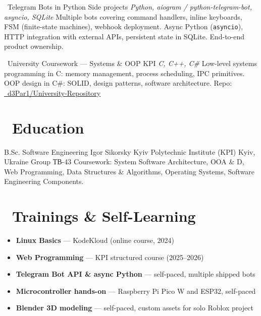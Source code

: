 \documentclass[10pt,a4paper,sans]{moderncv}
\begin{document}
        {\faRobot\ Telegram Bots in Python}
        {Side projects}
        {}
        {\textit{Python, aiogram / python-telegram-bot, asyncio, SQLite}}
        {\small Multiple bots covering command handlers, inline keyboards, FSM (finite-state machines), webhook deployment. Async Python (\texttt{asyncio}), HTTP integration with external APIs, persistent state in SQLite. End-to-end product ownership.}

        {\faGraduationCap\ University Coursework — Systems \& OOP}
        {KPI}
        {}
        {\textit{C, C++, C\#}}
        {\small Low-level systems programming in C: memory management, process scheduling, IPC primitives. OOP design in C\#: SOLID, design patterns, software architecture. Repo: \href{https://github.com/d3Par1/University-Repository}{\faGithub\ d3Par1/University-Repository}}

\section{\faUniversity\ Education}
        {B.Sc. Software Engineering}
        {Igor Sikorsky Kyiv Polytechnic Institute (KPI)}
        {Kyiv, Ukraine}
        {Group \textukrainian{ТВ}-43}
        {\small Coursework: System Software Architecture, OOA \& D, Web Programming, Data Structures \& Algorithms, Operating Systems, Software Engineering Components.}

\section{\faCertificate\ Trainings \& Self-Learning}
\begin{itemize}
    \item[\faBookmark] \small \textbf{Linux Basics} — KodeKloud (online course, 2024)
    \item[\faBookmark] \small \textbf{Web Programming} — KPI structured course (2025--2026)
    \item[\faBookmark] \small \textbf{Telegram Bot API \& async Python} — self-paced, multiple shipped bots
    \item[\faBookmark] \small \textbf{Microcontroller hands-on} — Raspberry Pi Pico W and ESP32, self-paced
    \item[\faBookmark] \small \textbf{Blender 3D modeling} — self-paced, custom assets for solo Roblox project
\end{itemize}
\end{document}
